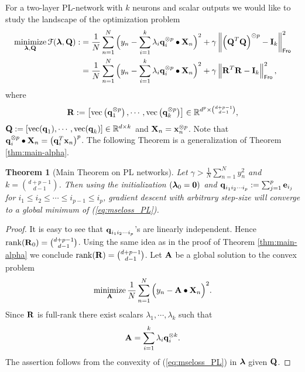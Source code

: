 \documentclass[11pt]{article}
\theoremstyle{plain}
\newtheorem{theorem}{Theorem}
\DeclareMathOperator*{\minimize}{minimize}
\DeclareMathOperator*{\rank}{rank}
\DeclareMathOperator*{\vectorize}{vec}
\def\R{\mathbb{R}}
\theoremstyle{plain}
\numberwithin{equation}{section}
\numberwithin{lemma}{section}
\numberwithin{theorem}{section}
\numberwithin{corollary}{section}
\numberwithin{observation}{section}
\numberwithin{definition}{section}
\numberwithin{example}{section}
\begin{document}
For a two-layer PL-network with $k$ neurons and scalar outputs we would like to study the landscape of the optimization problem
\begin{align} \label{eq:mseloss_PL}
    \minimize_{\V{\lambda},\Mx{Q}} \mathcal{F}(\V{\lambda},\Mx{Q}):&= \frac{1}{N}\sum_{n=1}^N \Big(y_n - \sum_{i=1}^k \lambda_i \V{q}_i^{\otimes p} \bullet \Mx{X}_n \Big)^2 + \gamma \left\|\left(\Mx{Q}^T\Mx{Q}\right)^{\odot p}-\Mx{I}_k\right\|_{\sf Fro}^2 \\
    & = \frac{1}{N}\sum_{n=1}^N \Big(y_n - \sum_{i=1}^k \lambda_i \V{q}_i^{\otimes p} \bullet \Mx{X}_n \Big)^2 + \gamma \left\|\Mx{R}^T\Mx{R}-\Mx{I}_k\right\|_{\sf Fro}^2,
\end{align}
where 
\[
\Mx{R} := \left[ \vectorize \left(\V{q}^{\otimes p}_1\right),\cdots,\vectorize \left(\V{q}^{\otimes p}_k\right) \right] \in \R^{d^p \times \binom{d+p-1}{d-1 }},
\]
\noindent $\Mx{Q}:=[\vectorize(\V{q}_1),\cdots,\vectorize(\V{q}_k)] \in \R^{d \times k} $ and $\Mx{X}_n = \V{x}_n^{\otimes p}$. Note that $\V{q}_i^{\otimes p} \bullet \Mx{X}_n = \left(\V{q}_i^T \V{x}_n\right)^p$. The following Theorem is a generalization of Theorem \ref{thm:main-alpha}.

\begin{theorem}[Main Theorem on PL networks] \label{thm:PL} Let $\gamma > \frac{1}{N}\sum_{n=1}^N y_n^2$ and $k = \binom{d+p-1}{d-1 }$. Then using the initialization $(\V{\lambda}_0 = \V{0})$ and $\V{q}_{i_1i_2\cdots i_p } : = \sum_{j=1}^p \V{e}_{i_j}$ for $i_1 \leq i_2 \leq \cdots \leq i_{p-1} \leq i_p$, gradient descent with arbitrary step-size will converge to a global minimum of (\ref{eq:mseloss_PL}).
\end{theorem}
\begin{proof} It is easy to see that $\V{q}_{i_1i_2\cdots i_p }$'s are linearly independent. Hence $\rank(\Mx{R}_0) = \binom{d+p-1}{d-1 }$. Using the same idea as in the proof of Theorem \ref{thm:main-alpha} we conclude $\rank(\Mx{R}) = \binom{d+p-1}{d-1 }$. Let $\Mx{A}$ be a global solution to the convex problem
\begin{equation} \label{eq:mseloss_PL_cvx}
    \minimize_{\Mx{A}} \frac{1}{N}\sum_{n=1}^N \Big(y_n - \Mx{A} \bullet \Mx{X}_n \Big)^2.
\end{equation}
Since $\Mx{R}$ is full-rank there exist scalars $\lambda_{1}, \cdots, \lambda_k$ such that
\[
\Mx{A} = \sum_{i=1}^k \lambda_i \V{q}_i^{\otimes k}.
\]
The assertion follows from the convexity of (\ref{eq:mseloss_PL}) in $\V{\lambda}$ given $\Mx{Q}$.
\end{proof}
\end{document}
